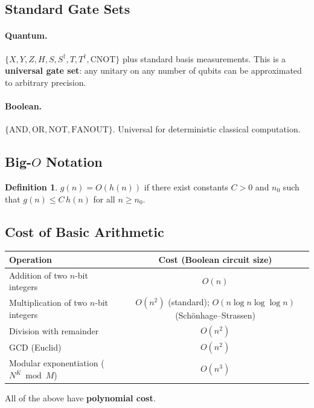 \documentclass[11pt]{article}
\theoremstyle{definition}
\newtheorem{definition}{Definition}[section]
\begin{document}
\subsection{Standard Gate Sets}

\paragraph{Quantum.}  $\{X,Y,Z,H,S,S^\dagger,T,T^\dagger,\mathrm{CNOT}\}$ plus standard basis measurements.  This is a \textbf{universal gate set}: any unitary on any number of qubits can be approximated to arbitrary precision.

\paragraph{Boolean.}  $\{\mathrm{AND},\mathrm{OR},\mathrm{NOT},\mathrm{FANOUT}\}$.  Universal for deterministic classical computation.

\subsection{Big-$O$ Notation}

\begin{definition}
$g(n)=O(h(n))$ if there exist constants $C>0$ and $n_0$ such that $g(n)\le C\,h(n)$ for all $n\ge n_0$.
\end{definition}

\subsection{Cost of Basic Arithmetic}

\begin{center}
\begin{tabular}{lc}
\hline
\textbf{Operation} & \textbf{Cost (Boolean circuit size)} \\\hline
Addition of two $n$-bit integers & $O(n)$ \\
Multiplication of two $n$-bit integers & $O(n^2)$ \;(standard); $O(n\log n\log\log n)$ (Sch\"onhage--Strassen) \\
Division with remainder & $O(n^2)$ \\
GCD (Euclid) & $O(n^2)$ \\
Modular exponentiation ($N^K\bmod M$) & $O(n^3)$ \\
\hline
\end{tabular}
\end{center}

All of the above have \textbf{polynomial cost}.
\end{document}
